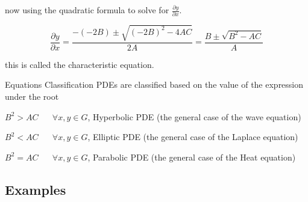 \documentclass[]{article}
\begin{document}
now using the quadratic formula to solve for $\frac{\partial y}{\partial x}$.

\[
    \frac{\partial y}{\partial x} = \frac{-\left(-2B\right)\pm\sqrt{{(-2B)}^2 -4AC}}{2A} = \frac{B\pm\sqrt{B^2 -AC}}{A}    
\]

this is called the characteristic equation.

\begin{enrichment*}{Equations Classification}
PDEs are classified based on the value of the expression under the root

$B^2 > AC \;\;\;\;\;\; \forall x,y\in G$, Hyperbolic PDE (the general case of the wave equation) 

$B^2 < AC \;\;\;\;\;\; \forall x,y\in G$, Elliptic PDE (the general case of the Laplace equation) 

$B^2 = AC \;\;\;\;\;\; \forall x,y\in G$, Parabolic PDE (the general case of the Heat equation) 
\end{enrichment*}


\subsection{Examples}
\end{document}
